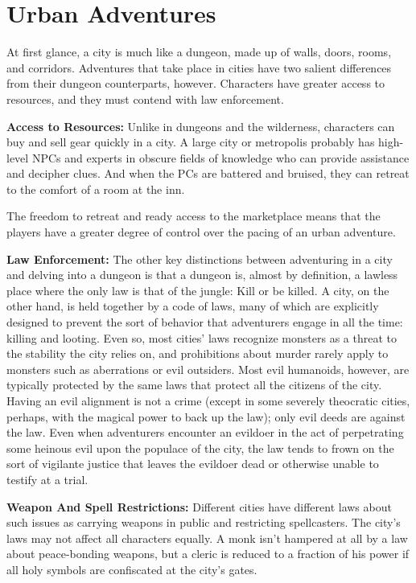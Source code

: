 \section{Urban Adventures}

At first glance, a city is much like a dungeon, made up of walls, doors, rooms, 
and corridors. Adventures that take place in cities have two salient differences 
from their dungeon counterparts, however. Characters have greater access to resources, 
and they must contend with law enforcement.

\textbf{Access to Resources:} Unlike in dungeons and the wilderness, characters 
can buy and sell gear quickly in a city. A large city or metropolis probably has 
high-level NPCs and experts in obscure fields of knowledge who can provide assistance 
and decipher clues. And when the PCs are battered and bruised, they can retreat 
to the comfort of a room at the inn.

The freedom to retreat and ready access to the marketplace means that the players 
have a greater degree of control over the pacing of an urban adventure.

\textbf{Law Enforcement:} The other key distinctions between adventuring in a city 
and delving into a dungeon is that a dungeon is, almost by definition, a lawless 
place where the only law is that of the jungle: Kill or be killed. A city, on the 
other hand, is held together by a code of laws, many of which are explicitly designed 
to prevent the sort of behavior that adventurers engage in all the time: killing 
and looting. Even so, most cities' laws recognize monsters as a threat to the stability 
the city relies on, and prohibitions about murder rarely apply to monsters such 
as aberrations or evil outsiders. Most evil humanoids, however, are typically protected 
by the same laws that protect all the citizens of the city. Having an evil alignment 
is not a crime (except in some severely theocratic cities, perhaps, with the magical 
power to back up the law); only evil deeds are against the law. Even when adventurers 
encounter an evildoer in the act of perpetrating some heinous evil upon the populace 
of the city, the law tends to frown on the sort of vigilante justice that leaves 
the evildoer dead or otherwise unable to testify at a trial.

\textbf{Weapon And Spell Restrictions:} Different cities have different laws about such issues as carrying weapons in public 
and restricting spellcasters. The city's laws may not affect all characters equally. A monk isn't hampered at 
all by a law about peace-bonding weapons, but a cleric is reduced to a fraction 
of his power if all holy symbols are confiscated at the city's gates.

